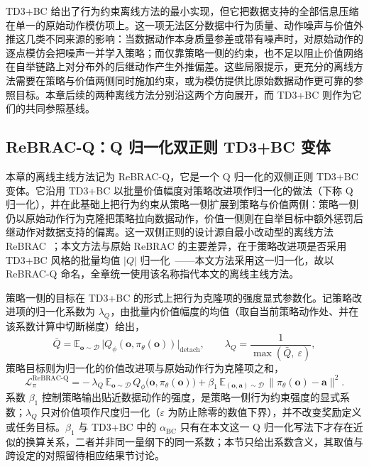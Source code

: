 TD3+BC 给出了行为约束离线方法的最小实现，但它把数据支持的全部信息压缩在单一的原始动作模仿项上。这一项无法区分数据中行为质量、动作噪声与价值外推这几类不同来源的影响：当数据动作本身质量参差或带有噪声时，对原始动作的逐点模仿会把噪声一并学入策略；而仅靠策略一侧的约束，也不足以阻止价值网络在自举链路上对分布外的后继动作产生外推偏差。这些局限提示，更充分的离线方法需要在策略与价值两侧同时施加约束，或为模仿提供比原始数据动作更可靠的参照目标。本章后续的两种离线方法分别沿这两个方向展开，而 TD3+BC 则作为它们的共同参照基线。

\subsection{ReBRAC-Q：Q 归一化双正则 TD3+BC 变体}\label{subsec:ch5_method_rebrac}

本章的离线主线方法记为 ReBRAC-Q，它是一个 Q 归一化的双侧正则 TD3+BC 变体。它沿用 TD3+BC 以批量价值幅度对策略改进项作归一化的做法（下称 Q 归一化），并在此基础上把行为约束从策略一侧扩展到策略与价值两侧：策略一侧仍以原始动作行为克隆把策略拉向数据动作，价值一侧则在自举目标中额外惩罚后继动作对数据支持的偏离。这一双侧正则的设计源自最小改动型的离线方法 ReBRAC~\citep{tarasov2023rebrac}；本文方法与原始 ReBRAC 的主要差异，在于策略改进项是否采用 TD3+BC 风格的批量均值 $|Q|$ 归一化~\citep{fujimoto2021td3bc}——本文方法采用这一归一化，故以 ReBRAC-Q 命名，全章统一使用该名称指代本文的离线主线方法。

策略一侧的目标在 TD3+BC 的形式上把行为克隆项的强度显式参数化。记策略改进项的归一化系数为 $\lambda_Q$，由批量内价值幅度的均值（取自当前策略动作处、并在该系数计算中切断梯度）给出，
\begin{equation}
\bar Q = \mathbb{E}_{\mathbf{o}\sim\mathcal{D}}\,\big|Q_\phi(\mathbf{o},\pi_\theta(\mathbf{o}))\big|_{\mathrm{detach}},
\qquad
\lambda_Q = \frac{1}{\max(\bar Q,\ \varepsilon)},
\label{eq:ch5_rebrac_qnorm}
\end{equation}
策略目标则为归一化的价值改进项与原始动作行为克隆项之和，
\begin{equation}
\mathcal{L}_{\pi}^{\mathrm{ReBRAC\text{-}Q}}
= -\,\lambda_Q\,
\mathbb{E}_{\mathbf{o}\sim\mathcal{D}}\,Q_\phi\big(\mathbf{o},\pi_\theta(\mathbf{o})\big)
+ \beta_1\,
\mathbb{E}_{(\mathbf{o},\mathbf{a})\sim\mathcal{D}}\,\big\|\pi_\theta(\mathbf{o}) - \mathbf{a}\big\|^2.
\label{eq:ch5_rebrac_actor}
\end{equation}
系数 $\beta_1$ 控制策略输出贴近数据动作的强度，是策略一侧行为约束强度的显式系数；$\lambda_Q$ 只对价值项作尺度归一化（$\varepsilon$ 为防止除零的数值下界），并不改变奖励定义或任务目标。$\beta_1$ 与 TD3+BC 中的 $\alpha_{\mathrm{BC}}$ 只有在本文这一 Q 归一化写法下才存在近似的换算关系，二者并非同一量纲下的同一系数；本节只给出系数含义，其取值与跨设定的对照留待相应结果节讨论。

